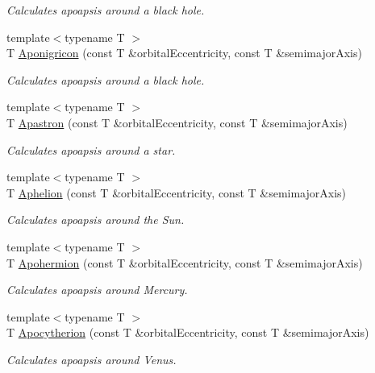 \begin{DoxyCompactItemize}
\begin{DoxyCompactList}\small\item\em Calculates apoapsis around a black hole. \end{DoxyCompactList}\item 
{\footnotesize template$<$typename T $>$ }\\T \hyperlink{group___apoapsis_ga83e866e2f887ff8eafbc3971d4cab8be}{Aponigricon} (const T \&orbital\+Eccentricity, const T \&semimajor\+Axis)
\begin{DoxyCompactList}\small\item\em Calculates apoapsis around a black hole. \end{DoxyCompactList}\item 
{\footnotesize template$<$typename T $>$ }\\T \hyperlink{group___apoapsis_ga2fc1c406ce10f59b4f325150aecd279a}{Apastron} (const T \&orbital\+Eccentricity, const T \&semimajor\+Axis)
\begin{DoxyCompactList}\small\item\em Calculates apoapsis around a star. \end{DoxyCompactList}\item 
{\footnotesize template$<$typename T $>$ }\\T \hyperlink{group___apoapsis_ga77dadb4d082a441c8e85203c983722c7}{Aphelion} (const T \&orbital\+Eccentricity, const T \&semimajor\+Axis)
\begin{DoxyCompactList}\small\item\em Calculates apoapsis around the Sun. \end{DoxyCompactList}\item 
{\footnotesize template$<$typename T $>$ }\\T \hyperlink{group___apoapsis_gab002349e578241b3514f2212da9a7d48}{Apohermion} (const T \&orbital\+Eccentricity, const T \&semimajor\+Axis)
\begin{DoxyCompactList}\small\item\em Calculates apoapsis around Mercury. \end{DoxyCompactList}\item 
{\footnotesize template$<$typename T $>$ }\\T \hyperlink{group___apoapsis_ga59a284bb0bc11848c5b9ef1283033425}{Apocytherion} (const T \&orbital\+Eccentricity, const T \&semimajor\+Axis)
\begin{DoxyCompactList}\small\item\em Calculates apoapsis around Venus. \end{DoxyCompactList}\item 

\end{DoxyCompactItemize}
